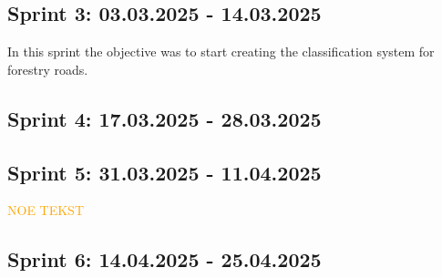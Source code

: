 \subsection{Sprint 3: 03.03.2025 - 14.03.2025}

In this sprint the objective was to start creating the classification system for forestry roads. 

\subsection{Sprint 4: 17.03.2025 - 28.03.2025}

\subsection{Sprint 5: 31.03.2025 - 11.04.2025}

\textcolor{orange}{NOE TEKST}

\subsection{Sprint 6: 14.04.2025 - 25.04.2025}

